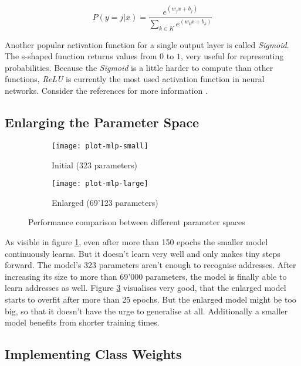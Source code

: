 \begin{equation}
    \label{math:softmax}
    P(y=j | x) = \frac{e^{(w_jx+b_j)}}{\sum_{k \in K} e^{(w_kx+b_k)}}
\end{equation}

Another popular activation function for a single output layer is called \emph{Sigmoid}. The s-shaped function returns values from $0$ to $1$, very useful for representing probabilities. Because the \emph{Sigmoid} is a little harder to compute than other functions, \emph{ReLU} is currently the most used activation function in neural networks. Consider the references for more information \cite{act17}.

\subsection{Enlarging the Parameter Space}

\begin{figure}[!ht]
    \begin{subfigure}{0.5\textwidth}
        \texttt{[image: plot-mlp-small]}
        \caption{Initial (323 parameters)}
        \label{fig:plot-mlp-small}
    \end{subfigure}
    \begin{subfigure}{0.5\textwidth}
        \texttt{[image: plot-mlp-large]}
        \caption{Enlarged (69'123 parameters)}
        \label{fig:plot-mlp-large}
    \end{subfigure}
    \caption{Performance comparison between different parameter spaces}
\end{figure}

As visible in figure \ref{fig:plot-mlp-small}, even after more than 150 epochs the smaller model continuously learns. But it doesn't learn very well and only makes tiny steps forward. The model's 323 parameters aren't enough to recognise addresses. After increasing its size to more than 69'000 parameters, the model is finally able to learn addresses as well. Figure \ref{fig:plot-mlp-large} visualises very good, that the enlarged model starts to overfit after more than 25 epochs. But the enlarged model might be too big, so that it doesn't have the urge to generalise at all. Additionally a smaller model benefits from shorter training times.

\subsection{Implementing Class Weights}

